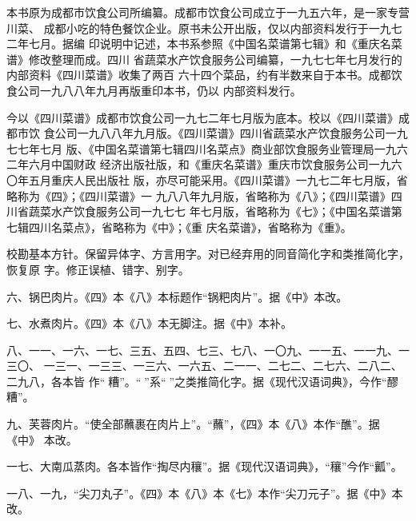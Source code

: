 \begin{list}{}{%
	\setlength{\topsep}{0pt}%
	\setlength{\leftmargin}{.529166mm}%
	\setlength{\rightmargin}{.529166mm}%
	\setlength{\listparindent}{\parindent}%
	\setlength{\itemindent}{\parindent}%
	\setlength{\parsep}{\parskip}%
	\addtolength{\textheight}{2.800042mm}%
}%
\item[]%

\vspace{0\baselineskip plus .5\baselineskip}%

本书原为成都市饮食公司所编纂。成都市饮食公司成立于一九五六年，是一家专营川菜、
成都小吃的特色餐饮企业。原书未公开出版，仅以内部资料发行于一九七二年七月。据编
印说明中记述，本书系参照《中国名菜谱第七辑》和《重庆名菜谱》修改整理而成。四川
省蔬菜水产饮食服务公司编纂，一九七七年七月发行的内部资料《四川菜谱》收集了两百
六十四个菜品，约有半数来自于本书。成都饮食公司一九八八年九月再版重印本书，仍以
内部资料发行。

今以《四川菜谱》成都市饮食公司一九七二年七月版为底本。校以《四川菜谱》成都市饮
食公司一九八八年九月版。《四川菜谱》四川省蔬菜水产饮食服务公司一九七七年七月
版、《中国名菜谱第七辑四川名菜点》商业部饮食服务业管理局一九六二年六月中国财政
经济出版社版，和《重庆名菜谱》重庆市饮食服务公司一九六〇年五月重庆人民出版社
版，亦尽可能采用。《四川菜谱》一九七二年七月版，省略称为《四》；《四川菜谱》一
九八八年九月版，省略称为《八》；《四川菜谱》四川省蔬菜水产饮食服务公司一九七七
年七月版，省略称为《七》；《中国名菜谱第七辑四川名菜点》，省略称为《中》；《重
庆名菜谱》，省略称为《重》。

校勘基本方针。保留异体字、方言用字。对已经弃用的同音简化字和类推简化字，恢复原
字。修正误植、错字、别字。

\vspace{1\baselineskip}%

六、锅巴肉片。《四》本《八》本标题作“锅粑肉片”。据《中》本改。

七、水煮肉片。《四》本《八》本无脚注{\footnotesize{}}。据《中》本补。

八、一一、一六、一七、三五、五四、七三、七八、一〇九、一一五、一一九、一三〇、
一三一、一三三、一三六、一六五、二一一、二七二、二七六、二八二、二九八，各本皆
作“𰪿糟”。“𰪿”系“𫃑”之类推简化字。据《现代汉语词典》，今作“醪糟”。

九、芙蓉肉片。“使全部蘸裹在肉片上”。“蘸”，《四》本《八》本作“醮”。据《中》
本改。

一七、大南瓜蒸肉。各本皆作“掏尽内穰”。据《现代汉语词典》，“穰”今作“瓤”。

一八、一九，“尖刀丸子”。《四》本《八》本《七》本作“尖刀元子”。据《中》本改。


\end{list}
